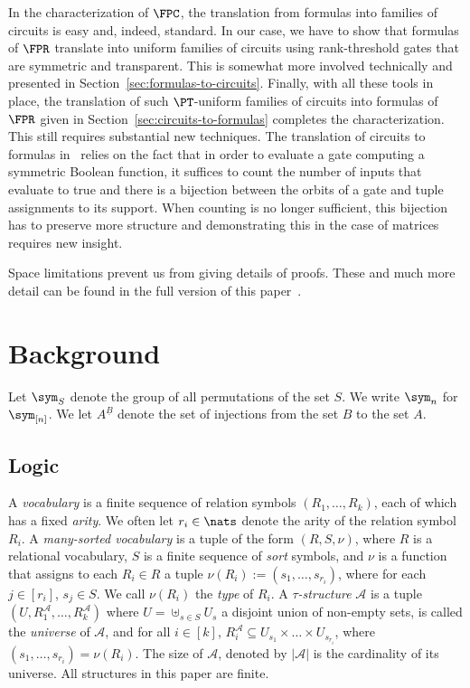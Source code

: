 \documentclass[a4paper,UKenglish]{lipics-v2018}
\begin{document}
In the characterization of $\FPC$, the translation from formulas into families
of circuits is easy and, indeed, standard. In our case, we have to show that
formulas of $\FPR$ translate into uniform families of circuits using
rank-threshold gates that are symmetric and transparent. This is somewhat more
involved technically and presented in
Section~\ref{sec:formulas-to-circuits}. Finally, with all these tools in place,
the translation of such $\PT$-uniform families of circuits into formulas of
$\FPR$ given in Section~\ref{sec:circuits-to-formulas} completes the
characterization. This still requires substantial new techniques. The
translation of circuits to formulas in~\cite{AndersonD17} relies on the fact
that in order to evaluate a gate computing a symmetric Boolean function, it
suffices to count the number of inputs that evaluate to true and there is a
bijection between the orbits of a gate and tuple assignments to its support.
When counting is no longer sufficient, this bijection has to preserve more
structure and demonstrating this in the case of matrices requires new
insight.

Space limitations prevent us from giving details of proofs.  These and
much more detail can be found in the full version of this
paper~\cite{DW-arxiv}. 


\section{Background}\label{sec:background}
Let $\sym_S$ denote the group of all permutations of the set $S$. We write
$\sym_n$ for $\sym_{[n]}$. We let $A^{\underline{B}}$ denote the set of
injections from the set $B$ to the set $A$.

\subsection{Logic}
A \emph{vocabulary} is a finite sequence of relation symbols $(R_1, \ldots,
R_k)$, each of which has a fixed \emph{arity}. We often let $r_i \in \nats$
denote the arity of the relation symbol $R_i$. A \emph{many-sorted vocabulary}
is a tuple of the form $(R, S, \nu)$, where $R$ is a relational vocabulary, $S$
is a finite sequence of \emph{sort} symbols, and $\nu$ is a function that
assigns to each $R_i \in R$ a tuple $\nu(R_i) := (s_1, \ldots, s_{r_i})$, where
for each $j \in [r_i]$, $s_j \in S$. We call $\nu(R_i)$ the \emph{type} of
$R_i$. A \emph{$\tau$-structure} $\mathcal{A}$ is a tuple $(U ,
R^{\mathcal{A}}_1 , \ldots , R^{\mathcal{A}}_k)$ where $U = \uplus_{s \in S }
U_{s}$ a disjoint union of non-empty sets, is called the \emph{universe} of
$\mathcal{A}$, and for all $i \in [k]$, $R^{\mathcal{A}}_i \subseteq U_{s_1} \times \ldots \times U_{s_{r_i}}$, where
$(s_1 , \ldots , s_{r_i}) = \nu (R_i)$. The size of $\mathcal{A}$, denoted by
$\vert \mathcal{A} \vert$ is the cardinality of its universe. All structures in
this paper are finite.
\end{document}
